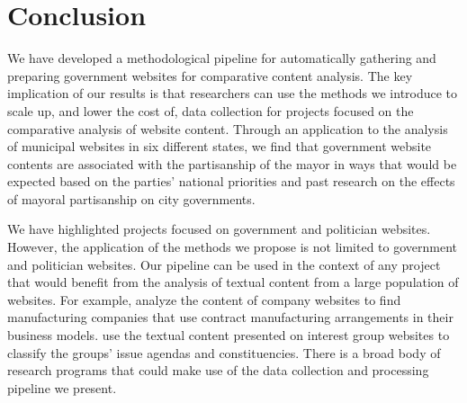 \documentclass[11pt]{article}
\begin{document}
\section{Conclusion}


We have developed a methodological pipeline for automatically gathering and preparing government websites for comparative content analysis. The key implication of our results is that researchers can use the methods we introduce to scale up, and lower the cost of, data collection for projects focused on the comparative analysis of website content. Through an application to the analysis of municipal websites in six different states, we find that government website contents are associated with the partisanship of the mayor in ways that would be expected based on the parties' national priorities and past research on the effects of mayoral partisanship on city governments.

We have highlighted projects focused on government and politician websites. However, the application of the methods we propose is not limited to government and politician websites. Our pipeline can be used in the context of any project that would benefit from the analysis of textual content from a large population of websites. For example, \citet{coyle2020no} analyze the content of company websites to find manufacturing companies that use contract manufacturing arrangements in their business models. \citet{kluver2015measuring} use the textual content presented on interest group websites to classify the groups' issue agendas and constituencies. There is a broad body of research programs that could make use of the data collection and processing pipeline we present.
 



%
%

%

\end{document}
